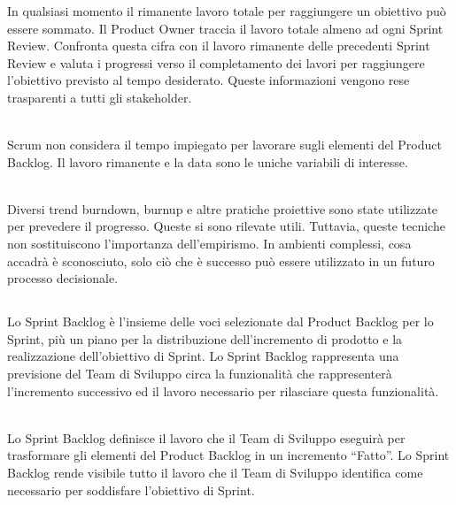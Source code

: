 \subsubsection*{\color{SteelBlue}{Monitorare i Progressi verso un Obiettivo}} %
\label{ssub:monitoring_progress_toward_a_great}
In qualsiasi momento il rimanente lavoro totale per raggiungere un obiettivo pu\`o essere sommato. Il 
Product Owner traccia il lavoro totale almeno ad ogni Sprint Review. Confronta questa cifra con il 
lavoro rimanente delle precedenti Sprint Review e valuta i progressi verso il completamento dei 
lavori per raggiungere l'obiettivo previsto al tempo desiderato. Queste informazioni vengono rese trasparenti a 
tutti gli stakeholder.\newline

\\Scrum non considera il tempo impiegato per lavorare sugli elementi del Product Backlog. Il lavoro 
rimanente e la data sono le uniche  variabili di interesse. \newline

\\Diversi trend burndown, burnup e altre pratiche proiettive sono state utilizzate per prevedere il 
progresso. Queste si sono rilevate utili. Tuttavia, queste tecniche non sostituiscono l'importanza 
dell'empirismo. In ambienti complessi, cosa accadr\`a \`e sconosciuto, solo ci\`o che \`e successo pu\`o 
essere utilizzato in un futuro processo decisionale.


\subsection*{\color{SteelBlue}{Sprint Backlog}}
\label{sec:sprint_backlog}
Lo Sprint Backlog \`e l'insieme delle voci selezionate dal Product Backlog per lo Sprint, 
pi\`u un piano per la distribuzione dell'incremento di prodotto e la realizzazione 
dell'obiettivo di Sprint. Lo Sprint Backlog rappresenta una previsione del Team di 
Sviluppo circa la funzionalità che rappresenter\`a  l'incremento successivo ed il lavoro 
necessario per rilasciare questa funzionalit\`a. \newline

\\ Lo Sprint Backlog definisce il lavoro che il Team di Sviluppo eseguir\`a per 
trasformare gli elementi del Product Backlog in un incremento ``Fatto''. Lo Sprint Backlog rende visibile tutto il 
lavoro che il Team di Sviluppo identifica come necessario per soddisfare l'obiettivo di Sprint. \newline

